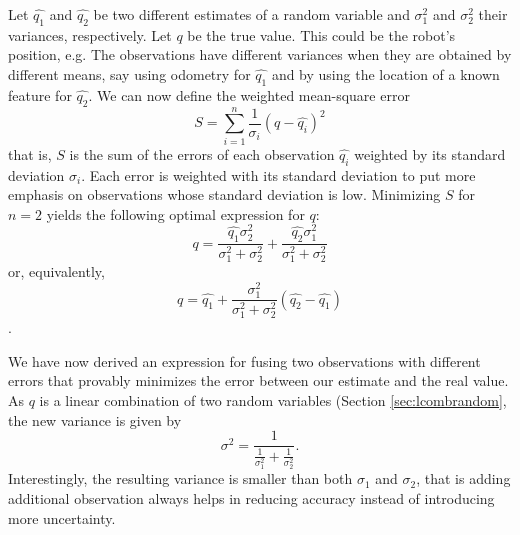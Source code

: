  Let $ \hat{q_1}$ and $ \hat{q_2}$ be two different estimates of a random variable and $ \sigma^2_1$ and $ \sigma^2_2$ their variances, respectively. Let $ q$ be the true value. This could be the robot's position, e.g. The observations have different variances when they are obtained by  different means, say using odometry for $ \hat{q_1}$ and by using the location of a known feature for $ \hat{q_2}$. We can now define the weighted mean-square error
 \begin{equation}
S=\displaystyle\sum_{i=1}^{n}\frac{1}{\sigma_i} (q-\hat{q_i})^2
\end{equation}
that is, $ S$ is the sum of the errors of each observation $ \hat{q_i}$ weighted by its standard deviation $ \sigma_i$. Each error is weighted  with its standard deviation to put more emphasis on observations whose standard deviation is low. Minimizing  $S$ for $n=2$ yields the following optimal expression for $q$:
\begin{equation}
q=\frac{\hat{q_1}\sigma_2^2}{\sigma_1^2+\sigma_2^2}+\frac{\hat{q_2}\sigma_1^2}{\sigma_1^2+\sigma_2^2}
\end{equation}
or, equivalently, 
\begin{equation}
q=\hat{q_1}+\frac{\sigma_1^2}{\sigma_1^2+\sigma_2^2}(\hat{q_2}-\hat{q_1})\label{eq:optimalfusion}
\end{equation}.

We have now derived an expression for fusing two observations with different errors that provably minimizes the error between our estimate and the real value. As $q$ is a linear combination of two random variables (Section \ref{sec:lcombrandom}, the new variance is given by
\begin{equation}
\sigma^2=\frac{1}{\frac{1}{\sigma_1^2}+\frac{1}{\sigma_2^2}}.
\end{equation}
Interestingly, the resulting variance is smaller than both $\sigma_1$ and $\sigma_2$, that is adding additional observation always helps in reducing accuracy instead of introducing more uncertainty. 

